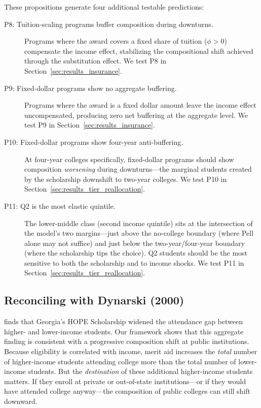 These propositions generate four additional testable predictions:

\begin{description}
\item[P8: Tuition-scaling programs buffer composition during
  downturns.] Programs where the award covers a fixed share of tuition
  ($\phi > 0$) compensate the income effect, stabilizing the
  compositional shift achieved through the substitution effect.
  We test P8 in Section~\ref{sec:results_insurance}.

\item[P9: Fixed-dollar programs show no aggregate buffering.] Programs
  where the award is a fixed dollar amount leave the income effect
  uncompensated, producing zero net buffering at the aggregate level.
  We test P9 in Section~\ref{sec:results_insurance}.

\item[P10: Fixed-dollar programs show four-year anti-buffering.]
  At four-year colleges specifically, fixed-dollar programs should show
  composition \emph{worsening} during downturns---the marginal
  students created by the scholarship downshift to two-year colleges.
  We test P10 in Section~\ref{sec:results_tier_reallocation}.

\item[P11: Q2 is the most elastic quintile.] The lower-middle class
  (second income quintile) sits at the intersection of the model's two
  margins---just above the no-college boundary (where Pell alone may
  not suffice) and just below the two-year/four-year boundary (where
  the scholarship tips the choice). Q2 students should be the most
  sensitive to both the scholarship and to income shocks.
  We test P11 in Section~\ref{sec:results_tier_reallocation}.
\end{description}

\subsection{Reconciling with Dynarski (2000)}

\textcite{dynarski2000hope} finds that Georgia's HOPE Scholarship
widened the attendance gap between higher- and lower-income students.
Our framework shows that this aggregate finding is consistent with a
progressive composition shift at public institutions. Because
eligibility is correlated with income, merit aid increases the
\emph{total} number of higher-income students attending college more
than the total number of lower-income students. But the
\emph{destination} of these additional higher-income students matters.
If they enroll at private or out-of-state institutions---or if they
would have attended college anyway---the composition of public colleges
can still shift downward.

